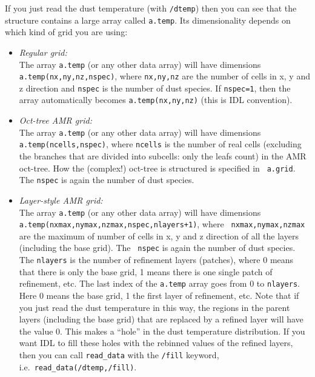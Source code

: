 \documentclass{report}
\begin{document}
If you just read the dust temperature (with {\small\tt /dtemp}) then you
can see that the structure contains a large array called {\small\tt a.temp}.
Its dimensionality depends on which kind of grid you are using:
\begin{itemize}
\item {\em Regular grid:}\\ The array {\small\tt a.temp} (or any other data
  array) will have dimensions {\small\tt a.temp(nx,ny,nz,nspec)}, where
  {\small\tt nx,ny,nz} are the number of cells in x, y and z direction and
  {\small\tt nspec} is the number of dust species. If {\small\tt nspec=1},
  then the array automatically becomes {\small\tt a.temp(nx,ny,nz)} (this is
  IDL convention).
\item {\em Oct-tree AMR grid:}\\ The array {\small\tt a.temp} (or any other
  data array) will have dimensions {\small\tt a.temp(ncells,nspec)}, where
  {\small\tt ncells} is the number of real cells (excluding the branches
  that are divided into subcells: only the leafs count) in the AMR oct-tree.
  How the (complex!) oct-tree is structured is specified in {\small\tt
    a.grid}. The {\small\tt nspec} is again the number of dust species.
\item {\em Layer-style AMR grid:}\\ The array {\small\tt a.temp} (or any other
  data array) will have dimensions {\small\tt
    a.temp(nxmax,nymax,nzmax,nspec,nlayers+1)}, where {\small\tt
    nxmax,nymax,nzmax} are the maximum of number of cells in x, y and z
  direction of all the layers (including the base grid). The {\small\tt
    nspec} is again the number of dust species. The {\small\tt nlayers} is
  the number of refinement layers (patches), where 0 means that there is
  only the base grid, 1 means there is one single patch of refinement, etc.
  The last index of the {\small\tt a.temp} array goes from 0 to
  {\small\tt nlayers}. Here 0 means the base grid, 1 the first layer of
  refinement, etc. Note that if you just read the dust temperature in 
  this way, the regions in the parent layers (including the base grid)
  that are replaced by a refined layer will have the value 0. This makes
  a ``hole'' in the dust temperature distribution. If you want IDL to
  fill these holes with the rebinned values of the refined layers, then
  you can call {\small\tt read\_data} with the {\small\tt /fill} keyword,
  i.e.\ {\small\tt read\_data(/dtemp,/fill)}.
\end{itemize}
\end{document}
